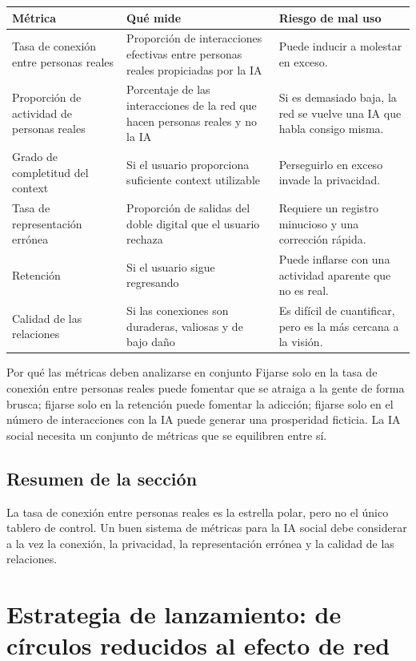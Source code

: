 \documentclass[a4paper]{article}
\begin{document}
\noindent\begin{longtable}{p{}p{}p{}}
\toprule
Métrica & Qué mide & Riesgo de mal uso \\
\midrule
Tasa de conexión entre personas reales & Proporción de interacciones efectivas entre personas reales propiciadas por la IA & Puede inducir a molestar en exceso. \\
Proporción de actividad de personas reales & Porcentaje de las interacciones de la red que hacen personas reales y no la IA & Si es demasiado baja, la red se vuelve una IA que habla consigo misma. \\
Grado de completitud del context & Si el usuario proporciona suficiente context utilizable & Perseguirlo en exceso invade la privacidad. \\
Tasa de representación errónea & Proporción de salidas del doble digital que el usuario rechaza & Requiere un registro minucioso y una corrección rápida. \\
Retención & Si el usuario sigue regresando & Puede inflarse con una actividad aparente que no es real. \\
Calidad de las relaciones & Si las conexiones son duraderas, valiosas y de bajo daño & Es difícil de cuantificar, pero es la más cercana a la visión. \\
\bottomrule
\end{longtable}

\begin{knowledgebox}{Por qué las métricas deben analizarse en conjunto}
Fijarse solo en la tasa de conexión entre personas reales puede fomentar que se atraiga a la gente de forma brusca; fijarse solo en la retención puede fomentar la adicción; fijarse solo en el número de interacciones con la IA puede generar una prosperidad ficticia. La IA social necesita un conjunto de métricas que se equilibren entre sí.
\end{knowledgebox}

\subsection{Resumen de la sección}

La tasa de conexión entre personas reales es la estrella polar, pero no el único tablero de control. Un buen sistema de métricas para la IA social debe considerar a la vez la conexión, la privacidad, la representación errónea y la calidad de las relaciones.
\section{Estrategia de lanzamiento: de círculos reducidos al efecto de red}
\end{document}
